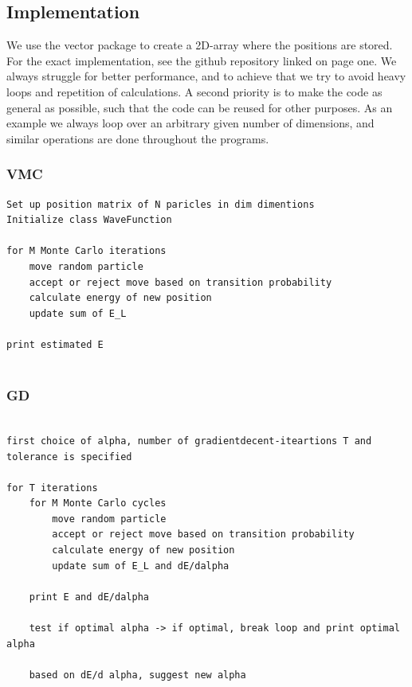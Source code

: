 \documentclass[norsk,a4paper,12pt]{article}
\begin{document}
\subsection{Implementation}
We use the vector package to create a 2D-array where the positions are stored. For the exact implementation, see the github repository linked on page one. We always struggle for better performance, and to achieve that we try to avoid heavy loops and repetition of calculations. A second priority is to make the code as general as possible, such that the code can be reused for other purposes. As an example we always loop over an arbitrary given number of dimensions, and similar operations are done throughout the programs. 

\subsubsection{VMC}

\lstset{basicstyle=\scriptsize}
\begin{lstlisting}
Set up position matrix of N paricles in dim dimentions
Initialize class WaveFunction
	
for M Monte Carlo iterations
	move random particle
	accept or reject move based on transition probability
	calculate energy of new position
	update sum of E_L

print estimated E 
	
\end{lstlisting}

\subsubsection{GD}

\lstset{basicstyle=\scriptsize}
\begin{lstlisting}

first choice of alpha, number of gradientdecent-iteartions T and tolerance is specified

for T iterations 
	for M Monte Carlo cycles
		move random particle
		accept or reject move based on transition probability
		calculate energy of new position
		update sum of E_L and dE/dalpha 
		
	print E and dE/dalpha
	
	test if optimal alpha -> if optimal, break loop and print optimal alpha
	
	based on dE/d alpha, suggest new alpha	

\end{lstlisting}
\end{document}
